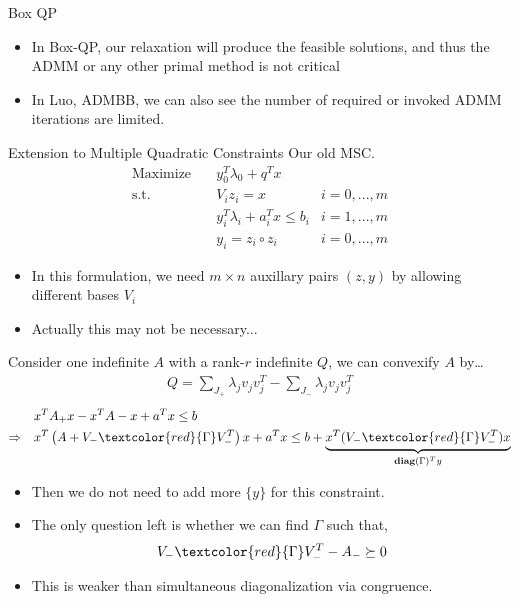 \documentclass[aspectratio=1610, 9pt]{beamer}
\newcommand{\diag}{\mathbf{diag}}
\newcommand{\red}[1]{\textcolor{red}{#1}}
\begin{document}
\begin{frame}[allowframebreaks]{Box QP}
\begin{table}[h!]
    \framebreak

    \begin{itemize}
      \item In Box-QP, our relaxation will produce the feasible solutions, and thus the ADMM or any other primal method is not critical
      \item In \textsf{Luo, ADMBB}, we can also see the number of required or invoked ADMM iterations are limited.
    \end{itemize}
  \end{table}


\end{frame}



\begin{frame}[allowframebreaks]{Extension to Multiple Quadratic Constraints}
  Our old MSC.
  \begin{align}
    \nonumber \mathrm{Maximize}\quad & y_0 ^T\lambda_0 + q^Tx                         \\
    \mathrm{s.t.} \quad              & V_i z_i = x                        & i=0,...,m \\
                                     & y_i ^T\lambda_i  + a_i^Tx  \le b_i & i=1,...,m \\
    \label{quad}                     & y_i = z_i \circ z_i                & i=0,...,m
  \end{align}
  \begin{itemize}
    \item In this formulation, we need \(m \times n\) auxillary pairs \((z, y)\) by allowing different bases \(V_i\)
    \item Actually this may not be necessary...
  \end{itemize}

  \framebreak
  Consider one indefinite \(A\) with a rank-\(r\) indefinite \(Q\), we can convexify \(A\) by\dots
  \begin{align*}
    Q = \sum_{J_+} \lambda_j v_jv_j^T - \sum_{J_-} \lambda_j v_jv_j^T
  \end{align*}
  \begin{eqnarray}
    & x^TA_+ x - x^TA-x + a^Tx \le b \\
    \Rightarrow \quad & x^T\left(A + V_-\red{\Gamma}V^T_-\right )x +a^Tx \le b + \underbrace{x^T(V_-\red{\Gamma}V^T_-)x}_{\diag(\Gamma)^Ty}
  \end{eqnarray}
  \begin{itemize}
    \item Then we do not need to add more \(\{y\}\) for this constraint.
    \item The only question left is whether we can find \(\Gamma\) such that,
          \begin{equation}
            V_-\red{\Gamma}V^T_- - A_- \succeq 0
          \end{equation}
    \item This is weaker than simultaneous diagonalization via congruence.
  \end{itemize}
\end{frame}
\end{document}
